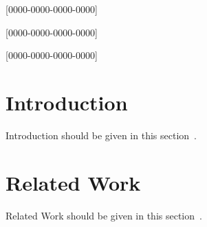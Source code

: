 \documentclass[twocolumn,proof]{ICCKjournal} %
\begin{document}
\author[1]{Camacho Lopez Andrés}[0000-0000-0000-0000]
\author[1][e-mail@e-mail.com]{Yafté S.A.}[0000-0000-0000-0000]
\author[1]{Solís Ruiz Juan Pablo}[0000-0000-0000-0000]





\maketitle
{}


\begin{figure}[b]
	\citationblock
	\vspace*{-.98em}
\end{figure}



\section{Introduction}
Introduction should be given in this section~\cite{1}.
\lipsum[2]

\section{Related Work}
Related Work should be given in this section~\cite{2}.
\lipsum[3]
\lipsum[3]
\end{document}
